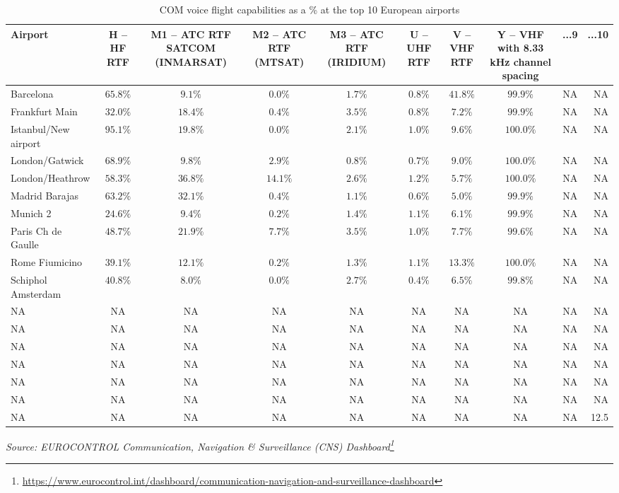 \documentclass[
  11pt,
  a4paper,
]{book}
\DeclareRobustCommand{\href}[2]{#2\footnote{\url{#1}}}
\begin{document}
\hypertarget{tbl-com-voice-top10}{}
\setlength{\LTpost}{0mm}
\begin{longtable}{lccccccccr}
\caption{\label{tbl-com-voice-top10}COM voice flight capabilities as a \% at the top 10 European airports }\tabularnewline

\toprule
Airport & H – HF RTF & M1 – ATC RTF SATCOM (INMARSAT) & M2 – ATC RTF (MTSAT) & M3 – ATC RTF (IRIDIUM) & U – UHF RTF & V – VHF RTF & Y – VHF with 8.33 kHz channel spacing & ...9 & ...10 \\ 
\midrule
Barcelona & $65.8\%$ & $9.1\%$ & $0.0\%$ & $1.7\%$ & $0.8\%$ & $41.8\%$ & $99.9\%$ & NA & NA \\ 
Frankfurt Main & $32.0\%$ & $18.4\%$ & $0.4\%$ & $3.5\%$ & $0.8\%$ & $7.2\%$ & $99.9\%$ & NA & NA \\ 
Istanbul/New airport & $95.1\%$ & $19.8\%$ & $0.0\%$ & $2.1\%$ & $1.0\%$ & $9.6\%$ & $100.0\%$ & NA & NA \\ 
London/Gatwick & $68.9\%$ & $9.8\%$ & $2.9\%$ & $0.8\%$ & $0.7\%$ & $9.0\%$ & $100.0\%$ & NA & NA \\ 
London/Heathrow & $58.3\%$ & $36.8\%$ & $14.1\%$ & $2.6\%$ & $1.2\%$ & $5.7\%$ & $100.0\%$ & NA & NA \\ 
Madrid Barajas & $63.2\%$ & $32.1\%$ & $0.4\%$ & $1.1\%$ & $0.6\%$ & $5.0\%$ & $99.9\%$ & NA & NA \\ 
Munich 2 & $24.6\%$ & $9.4\%$ & $0.2\%$ & $1.4\%$ & $1.1\%$ & $6.1\%$ & $99.9\%$ & NA & NA \\ 
Paris  Ch de Gaulle & $48.7\%$ & $21.9\%$ & $7.7\%$ & $3.5\%$ & $1.0\%$ & $7.7\%$ & $99.6\%$ & NA & NA \\ 
Rome Fiumicino & $39.1\%$ & $12.1\%$ & $0.2\%$ & $1.3\%$ & $1.1\%$ & $13.3\%$ & $100.0\%$ & NA & NA \\ 
Schiphol Amsterdam & $40.8\%$ & $8.0\%$ & $0.0\%$ & $2.7\%$ & $0.4\%$ & $6.5\%$ & $99.8\%$ & NA & NA \\ 
NA & NA & NA & NA & NA & NA & NA & NA & NA & NA \\ 
NA & NA & NA & NA & NA & NA & NA & NA & NA & NA \\ 
NA & NA & NA & NA & NA & NA & NA & NA & NA & NA \\ 
NA & NA & NA & NA & NA & NA & NA & NA & NA & NA \\ 
NA & NA & NA & NA & NA & NA & NA & NA & NA & NA \\ 
NA & NA & NA & NA & NA & NA & NA & NA & NA & NA \\ 
NA & NA & NA & NA & NA & NA & NA & NA & NA & 12.5 \\ 
\bottomrule
\end{longtable}
\begin{minipage}{\linewidth}
\emph{Source: \href{https://www.eurocontrol.int/dashboard/communication-navigation-and-surveillance-dashboard}{EUROCONTROL Communication, Navigation \& Surveillance (CNS) Dashboard}}\\
\end{minipage}
\end{document}
